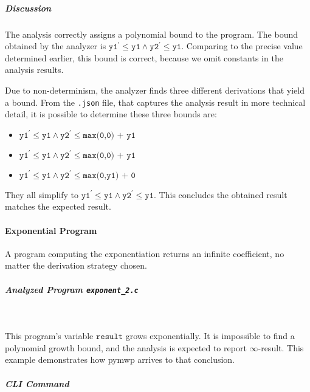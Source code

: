 \subparagraph*{Discussion}
The analysis correctly assigns a polynomial bound to the program.
The bound obtained by the analyzer is \(\texttt{y1}^\prime \leq \texttt{y1} \land \texttt{y2}^\prime \leq \texttt{y1}\).
Comparing to the precise value determined earlier, this bound is correct, because we omit constants in the analysis results.

Due to non-determinism, the analyzer finds three different derivations that yield a bound.
From the \texttt{.json} file, that captures the analysis result in more technical detail, it is possible to determine these three bounds are:

\begin{itemize}
    \item \(\texttt{y1}^\prime \leq \texttt{y1} \land \texttt{y2}^\prime \leq \texttt{max(0,0) + y1}\)
    \item \(\texttt{y1}^\prime \leq \texttt{y1} \land \texttt{y2}^\prime \leq \texttt{max(0,0) + y1}\)
    \item \(\texttt{y1}^\prime \leq \texttt{y1} \land \texttt{y2}^\prime \leq \texttt{max(0,y1) + 0}\)
\end{itemize}

They all simplify to \(\texttt{y1}^\prime \leq \texttt{y1} \land \texttt{y2}^\prime \leq \texttt{y1}\).
This concludes the obtained result matches the expected result.
\pagebreak

\paragraph{Exponential Program}\label{exponential-program}
A program computing the exponentiation returns an infinite coefficient, no matter the derivation strategy chosen.

\subparagraph*{Analyzed Program \texttt{exponent\_2.c}}\mbox{}\\
\begin{minipage}{\textwidth}

\end{minipage}

This program's variable \(\texttt{result}\) grows exponentially.
It is impossible to find a polynomial growth bound, and the analysis is expected to report \(\infty\)-result.
This example demonstrates how pymwp arrives to that conclusion.

\subparagraph*{CLI Command}\mbox{}\\

